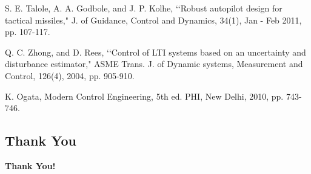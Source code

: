 \documentclass[table,10pt,red]{beamer}	%
\begin{document}
\begin{thebibliography}{1}
S. E. Talole, A. A. Godbole, and J. P. Kolhe, \lq \lq Robust autopilot design for tactical missiles," J. of Guidance, Control and Dynamics, 34(1), Jan - Feb 2011, pp. 107-117.
%

Q. C. Zhong, and D. Rees, \lq \lq Control of LTI systems based on an uncertainty and disturbance estimator," ASME Trans. J. of Dynamic systems, Measurement and Control, 126(4), 2004, pp. 905-910.

K. Ogata, Modern Control Engineering, 5th ed. PHI, New Delhi, 2010, pp. 743-746.



\end{thebibliography}
\subsection*{Thank You} %
\begin{frame}
\textbf{\LARGE Thank You!} \\[20pt]
\end{frame}
\end{document}
